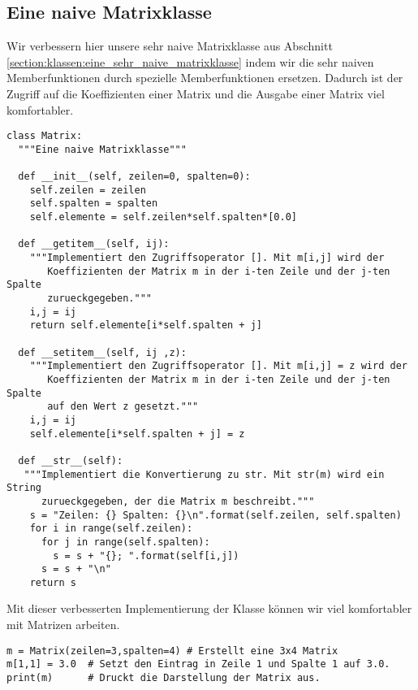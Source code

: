 \subsection{Eine naive Matrixklasse}
\label{section:klassen:eine_naive_matrixklasse}
Wir verbessern hier unsere sehr naive Matrixklasse aus Abschnitt \ref{section:klassen:eine_sehr_naive_matrixklasse}
indem wir die sehr naiven Memberfunktionen durch spezielle Memberfunktionen ersetzen.
Dadurch ist der Zugriff auf die Koeffizienten einer Matrix und die Ausgabe einer Matrix viel komfortabler.
\begin{lstlisting}
class Matrix:
  """Eine naive Matrixklasse"""
  
  def __init__(self, zeilen=0, spalten=0):
    self.zeilen = zeilen
    self.spalten = spalten
    self.elemente = self.zeilen*self.spalten*[0.0]
  
  def __getitem__(self, ij):
    """Implementiert den Zugriffsoperator []. Mit m[i,j] wird der
       Koeffizienten der Matrix m in der i-ten Zeile und der j-ten Spalte
       zurueckgegeben."""
    i,j = ij
    return self.elemente[i*self.spalten + j]
  
  def __setitem__(self, ij ,z):
    """Implementiert den Zugriffsoperator []. Mit m[i,j] = z wird der
       Koeffizienten der Matrix m in der i-ten Zeile und der j-ten Spalte
       auf den Wert z gesetzt."""
    i,j = ij
    self.elemente[i*self.spalten + j] = z
  
  def __str__(self):
   """Implementiert die Konvertierung zu str. Mit str(m) wird ein String
      zurueckgegeben, der die Matrix m beschreibt."""
    s = "Zeilen: {} Spalten: {}\n".format(self.zeilen, self.spalten)
    for i in range(self.zeilen):
      for j in range(self.spalten):
        s = s + "{}; ".format(self[i,j])
      s = s + "\n"
    return s
\end{lstlisting}
Mit dieser verbesserten Implementierung der Klasse  können wir viel komfortabler mit Matrizen arbeiten.
\begin{lstlisting}
m = Matrix(zeilen=3,spalten=4) # Erstellt eine 3x4 Matrix
m[1,1] = 3.0  # Setzt den Eintrag in Zeile 1 und Spalte 1 auf 3.0.
print(m)      # Druckt die Darstellung der Matrix aus.
\end{lstlisting}
